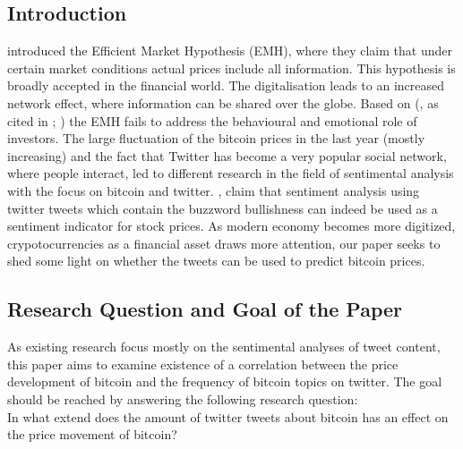 \documentclass[a4paper,american,12pt]{article}
\begin{document}
\begin{spacing}{1.2}
\cleardoublepage{}
\section{Introduction}
\label{sec:intro}

\textcite[p.~388]{malkiel1970efficient} introduced the Efficient Market Hypothesis (EMH), where they claim that under certain market conditions actual prices include all information. This hypothesis is broadly accepted in the financial world. The digitalisation leads to an increased network effect, where information can be shared over the globe. Based on \citeauthor{mao2015quantifying} (\citeyear[][p.~3]{mao2015quantifying}, as cited in \cite[][pp.~175--195]{shiller2015irrational}; \cite[][pp.~279]{kahneman2013prospect}) the EMH fails to address the behavioural and emotional role of investors. The large fluctuation of the bitcoin prices in the last year (mostly increasing) and the fact that Twitter has become a very popular social network, where people interact, led to different research in the field of sentimental analysis with the focus on bitcoin and twitter. \textcite[p.~18]{mao2015quantifying}, claim that sentiment analysis using twitter tweets which contain the buzzword bullishness can indeed be used as a sentiment indicator for stock prices. As modern economy becomes more digitized, crypotocurrencies as a financial asset draws more attention, our paper seeks to shed some light on whether the tweets can be used to predict bitcoin prices.

\subsection{Research Question and Goal of the Paper}
\label{sec:ResearchQandGoal}

As existing research focus mostly on the sentimental analyses of tweet content, this paper aims to examine existence of a correlation between the price development of bitcoin and the frequency of bitcoin topics on twitter. The goal should be reached by answering the following research question: \\
In what extend does the amount of twitter tweets about bitcoin has an effect on the price movement of bitcoin?


\end{spacing}
\end{document}
